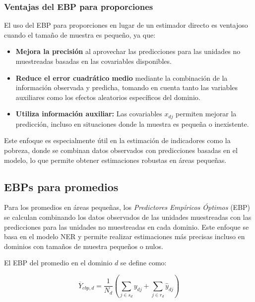 \documentclass[12pt,spanish]{article}
\begin{document}
\subsubsection*{Ventajas del EBP para proporciones}

El uso del EBP para proporciones en lugar de un estimador directo es ventajoso cuando el tamaño de muestra es pequeño, ya que:
\begin{itemize}
    \item \textbf{Mejora la precisión} al aprovechar las predicciones para las unidades no muestreadas basadas en las covariables disponibles.
    \item \textbf{Reduce el error cuadrático medio} mediante la combinación de la información observada y predicha, tomando en cuenta tanto las variables auxiliares como los efectos aleatorios específicos del dominio.
    \item \textbf{Utiliza información auxiliar:} Las covariables $x_{dj}$ permiten mejorar la predicción, incluso en situaciones donde la muestra es pequeña o inexistente.
\end{itemize}

Este enfoque es especialmente útil en la estimación de indicadores como la pobreza, donde se combinan datos observados con predicciones basadas en el modelo, lo que permite obtener estimaciones robustas en áreas pequeñas.

\subsection*{EBPs para promedios}

Para los promedios en áreas pequeñas, los \textit{Predictores Empíricos Óptimos} (EBP) se calculan combinando los datos observados de las unidades muestreadas con las predicciones para las unidades no muestreadas en cada dominio. Este enfoque se basa en el modelo NER y permite realizar estimaciones más precisas incluso en dominios con tamaños de muestra pequeños o nulos.

El EBP del promedio en el dominio $d$ se define como:

\[
\hat{\overline{Y}}_{ebp,d} = \frac{1}{N_d} \left( \sum_{j \in s_d} y_{dj} + \sum_{j \in r_d} \hat{y}_{dj} \right)
\]
\end{document}
